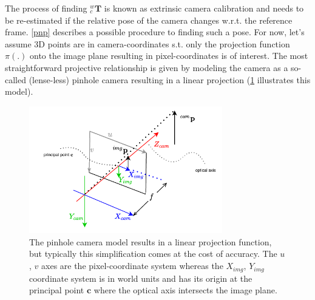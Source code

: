 \documentclass[headsepline, hidelinks, footsepline, footinclude=false, oneside, fontsize=11pt, paper=a4, listof=totoc, bibliography=totoc]{scrbook}
\begin{document}
The process of finding \({}^{w}_{c}\mathbf{T}\) is known as extrinsic camera calibration and needs to be re-estimated if the relative pose of the camera changes w.r.t. the reference frame.
\cref{pnp} describes a possible procedure to finding such a pose.
For now, let's assume 3D points are in camera-coordinates s.t. only the projection function \(\pi(.)\) onto the image plane resulting in pixel-coordinates is of interest.
The most straightforward projective relationship is given by modeling the camera as a so-called (lense-less) pinhole camera resulting in a linear projection (\cref{fig:pinhole-cam} illustrates this model). 

\begin{figure}[htbp]
\centering
\includegraphics[width=0.75\textwidth]{figures/pinhole-cam.pdf}
\caption{\label{fig:pinhole-cam}The pinhole camera model results in a linear projection function, but typically this simplification comes at the cost of accuracy. The \(u\), \(v\) axes are the pixel-coordinate system whereas the \(X_{img}\), \(Y_{img}\) coordinate system is in world units and has its origin at the principal point \(\mathbf{c}\) where the optical axis intersects the image plane.}
\end{figure}
\end{document}
